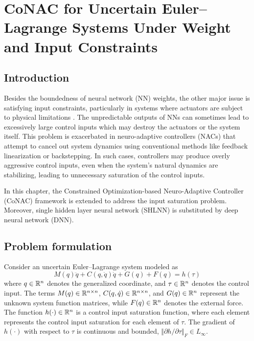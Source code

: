 
\chapter{
    CoNAC for Uncertain Euler–Lagrange Systems Under Weight and Input Constraints
} \label{chapter4}

\section{Introduction}

Besides the boundedness of neural network (NN) weights, the other major issue is satisfying input constraints, particularly in systems where actuators are subject to physical limitations \cite{RN24}. 
The unpredictable outputs of NNs can sometimes lead to excessively large control inputs which may destroy the actuators or the system itself. 
This problem is exacerbated in neuro-adaptive controllers (NACs) that attempt to cancel out system dynamics using conventional methods like feedback linearization or backstepping. 
In such cases, controllers may produce overly aggressive control inputs, even when the system's natural dynamics are stabilizing, leading to unnecessary saturation of the control inputs.

In this chapter, the Constrained Optimization-based Neuro-Adaptive Controller (CoNAC) framework is extended to address the input saturation problem.
Moreover, single hidden layer neural network (SHLNN) is substituted by deep neural network (DNN).

\section{Problem formulation} \label{chap4:problem}

Consider an uncertain Euler–Lagrange system modeled as
\begin{equation}
    M(q)\ddot q + C(q,\dot q)\dot q + G(q) + F(q) = h(\tau)
    \label{chap4:eq:sys1}
\end{equation}
where $q\in \mathbb{R}^n$ denotes the generalized coordinate, and $\tau\in\mathbb{R}^n$ denotes the control input. The terms $M(q)\in\mathbb{R}^{n\times n}$, $C(q,\dot q)\in\mathbb{R}^{n\times n}$, and $G(q)\in\mathbb{R}^{n}$ represent the unknown system function matrices, while $F(q)\in\mathbb{R}^{n}$ denotes the external force. The function $h(\cdot)\in \mathbb{R}^n$ is a control input saturation function, where each element represents the control input saturation for each element of $\tau$. The gradient of $h(\cdot)$ with respect to $\tau$ is continuous and bounded, \ie $\Vert\partial h/\partial \tau\Vert_F\in L_\infty$. 


